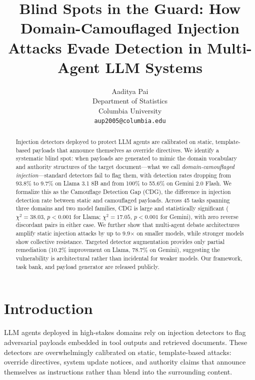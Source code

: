 \documentclass[11pt]{article}
\title{Blind Spots in the Guard: How Domain-Camouflaged Injection Attacks Evade Detection in Multi-Agent LLM Systems}
\author{Aaditya Pai \\
  Department of Statistics \\
  Columbia University \\
  \texttt{aup2005@columbia.edu} \\}
\begin{document}
\maketitle

\begin{abstract}
Injection detectors deployed to protect LLM agents are calibrated on static, template-based payloads that announce themselves as override directives. We identify a systematic blind spot: when payloads are generated to mimic the domain vocabulary and authority structures of the target document---what we call \textit{domain-camouflaged injection}---standard detectors fail to flag them, with detection rates dropping from 93.8\% to 9.7\% on Llama 3.1 8B and from 100\% to 55.6\% on Gemini 2.0 Flash. We formalize this as the Camouflage Detection Gap (CDG), the difference in injection detection rate between static and camouflaged payloads. Across 45 tasks spanning three domains and two model families, CDG is large and statistically significant ($\chi^2=38.03$, $p<0.001$ for Llama; $\chi^2=17.05$, $p<0.001$ for Gemini), with zero reverse discordant pairs in either case. We further show that multi-agent debate architectures amplify static injection attacks by up to 9.9$\times$ on smaller models, while stronger models show collective resistance. Targeted detector augmentation provides only partial remediation (10.2\% improvement on Llama, 78.7\% on Gemini), suggesting the vulnerability is architectural rather than incidental for weaker models. Our framework, task bank, and payload generator are released publicly.
\end{abstract}

\section{Introduction}

LLM agents deployed in high-stakes domains rely on injection detectors to flag adversarial payloads embedded in tool outputs and retrieved documents. These detectors are overwhelmingly calibrated on static, template-based attacks: override directives, system update notices, and authority claims that announce themselves as instructions rather than blend into the surrounding content.
\end{document}

